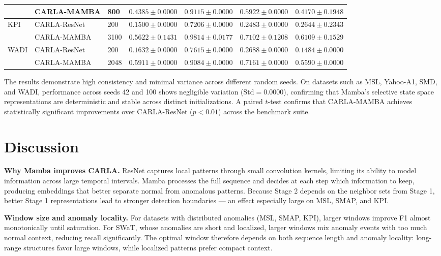 \documentclass[runningheads]{llncs}
\begin{document}
\begin{table}[htbp]
{\begin{tabular}{lllcccc}
 & CARLA-MAMBA  & 800 & $\mathbf{0.4385 \pm 0.0000}$ & $\mathbf{0.9115 \pm 0.0000}$ & $\mathbf{0.5922 \pm 0.0000}$ & $\mathbf{0.4170 \pm 0.1948}$ \\
\midrule
\multirow{2}{*}{KPI}
 & CARLA-ResNet & 200 & $0.1500 \pm 0.0000$ & $0.7206 \pm 0.0000$ & $0.2483 \pm 0.0000$ & $0.2644 \pm 0.2343$ \\
 & CARLA-MAMBA  & 3100 & $\mathbf{0.5622 \pm 0.1431}$ & $\mathbf{0.9814 \pm 0.0177}$ & $\mathbf{0.7102 \pm 0.1208}$ & $\mathbf{0.6109 \pm 0.1529}$ \\
\midrule
\multirow{2}{*}{WADI}
 & CARLA-ResNet & 200 & $0.1632 \pm 0.0000$ & $0.7615 \pm 0.0000$ & $0.2688 \pm 0.0000$ & $0.1484 \pm 0.0000$ \\
 & CARLA-MAMBA  & 2048 & $\mathbf{0.5911 \pm 0.0000}$ & $\mathbf{0.9084 \pm 0.0000}$ & $\mathbf{0.7161 \pm 0.0000}$ & $\mathbf{0.5590 \pm 0.0000}$ \\
\bottomrule
\end{tabular}%
}
\end{table}

The results demonstrate high consistency and minimal variance across different random seeds. On datasets such as MSL, Yahoo-A1, SMD, and WADI, performance across seeds 42 and 100 shows negligible variation ($\text{Std} = 0.0000$), confirming that Mamba's selective state space representations are deterministic and stable across distinct initializations. A paired $t$-test confirms that CARLA-MAMBA achieves statistically significant improvements over CARLA-ResNet ($p < 0.01$) across the benchmark suite.

\section{Discussion}
 
\textbf{Why Mamba improves CARLA.}
ResNet captures local patterns through small convolution kernels, limiting its ability to model information across large temporal intervals. Mamba processes the full sequence and decides at each step which information to keep, producing embeddings that better separate normal from anomalous patterns. Because Stage 2 depends on the neighbor sets from Stage 1, better Stage 1 representations lead to stronger detection boundaries — an effect especially large on MSL, SMAP, and KPI.
 
\textbf{Window size and anomaly locality.}
For datasets with distributed anomalies (MSL, SMAP, KPI), larger windows improve F1 almost monotonically until saturation. For SWaT, whose anomalies are short and localized, larger windows mix anomaly events with too much normal context, reducing recall significantly. The optimal window therefore depends on both sequence length and anomaly locality: long-range structures favor large windows, while localized patterns prefer compact context.
 
\end{document}
